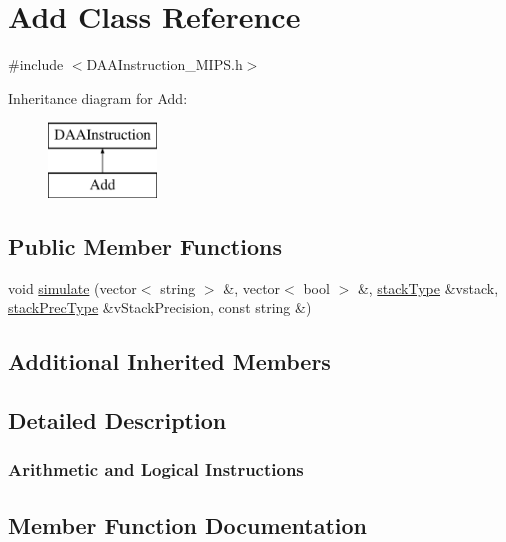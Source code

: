 \hypertarget{classAdd}{}\section{Add Class Reference}
\label{classAdd}


{\ttfamily \#include $<$D\+A\+A\+Instruction\+\_\+\+M\+I\+P\+S.\+h$>$}

Inheritance diagram for Add\+:\begin{figure}[H]
\begin{center}
\leavevmode
\includegraphics[height=2.000000cm]{classAdd}
\end{center}
\end{figure}
\subsection*{Public Member Functions}
\begin{DoxyCompactItemize}
\item 
void \hyperlink{classAdd_a6048e7447a91cb9edd65eb94184f9494}{simulate} (vector$<$ string $>$ \&, vector$<$ bool $>$ \&, \hyperlink{DAAInstruction_8h_a1b0e70ac1a04f06c8132055ed01f589f}{stack\+Type} \&vstack, \hyperlink{DAAInstruction_8h_ac5cb793e9dac3fa9693da78b7e29ab30}{stack\+Prec\+Type} \&v\+Stack\+Precision, const string \&)
\end{DoxyCompactItemize}
\subsection*{Additional Inherited Members}


\subsection{Detailed Description}


 \subsubsection*{Arithmetic and Logical Instructions }

\subsection{Member Function Documentation}
\mbox{\label{classAdd_a6048e7447a91cb9edd65eb94184f9494}} 
